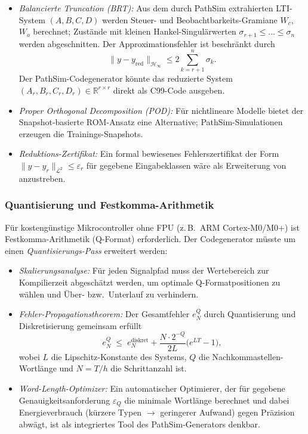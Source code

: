 ﻿\documentclass[12pt,a4paper]{article}
\theoremstyle{definition}
\begin{document}
\begin{itemize}
  \item \emph{Balancierte Truncation (BRT):} Aus dem durch PathSim
        extrahierten LTI-System $(A, B, C, D)$ werden Steuer- und
        Beobachtbarkeits-Gramiane $W_c$, $W_o$ berechnet; Zustände mit
        kleinen Hankel-Singulärwerten $\sigma_{r+1} \leq \ldots \leq
        \sigma_n$ werden abgeschnitten. Der Approximationsfehler ist
        beschränkt durch
        \[
          \|y - y_{\mathrm{red}}\|_{\mathcal{H}_\infty}
          \leq 2\sum_{k=r+1}^n \sigma_k.
        \]
        Der PathSim-Codegenerator könnte das reduzierte System
        $(A_r, B_r, C_r, D_r) \in \mathbb{R}^{r \times r}$ direkt als
        C99-Code ausgeben.

  \item \emph{Proper Orthogonal Decomposition (POD):} Für nichtlineare
        Modelle bietet der Snapshot-basierte ROM-Ansatz eine Alternative;
        PathSim-Simulationen erzeugen die Trainings-Snapshots.

  \item \emph{Reduktions-Zertifikat:} Ein formal bewiesenes
        Fehlerszertifikat der Form $\|y - y_r\|_{\mathcal{L}^2} \leq
        \varepsilon_r$ für gegebene Eingabeklassen wäre als
        Erweiterung von  anzustreben.
\end{itemize}

\subsubsection{Quantisierung und Festkomma-Arithmetik}

Für kostengünstige Mikrocontroller ohne FPU (z.\,B.\ ARM Cortex-M0/M0+)
ist Festkomma-Arithmetik (Q-Format) erforderlich. Der Codegenerator
müsste um einen \emph{Quantisierungs-Pass} erweitert werden:

\begin{itemize}
  \item \emph{Skalierungsanalyse:} Für jeden Signalpfad muss der
        Wertebereich zur Kompilierzeit abgeschätzt werden, um optimale
        Q-Formatpositionen zu wählen und Über- bzw.\ Unterlauf zu
        verhindern.

  \item \emph{Fehler-Propagationstheorem:} Der Gesamtfehler
        $e_N^Q$ durch Quantisierung und Diskretisierung gemeinsam erfüllt
        \[
          e_N^Q \;\leq\; e_N^{\mathrm{diskret}}
          + \frac{N \cdot 2^{-Q}}{2L}\bigl(e^{LT}-1\bigr),
        \]
        wobei $L$ die Lipschitz-Konstante des Systems, $Q$ die
        Nachkommastellen-Wortlänge und $N = T/h$ die Schrittanzahl ist.

  \item \emph{Word-Length-Optimizer:} Ein automatischer Optimierer, der
        für gegebene Genauigkeitsanforderung $\varepsilon_Q$ die minimale
        Wortlänge berechnet und dabei Energieverbrauch (kürzere Typen
        $\to$ geringerer Aufwand) gegen Präzision abwägt, ist als
        integriertes Tool des PathSim-Generators denkbar.
\end{itemize}
\end{document}
